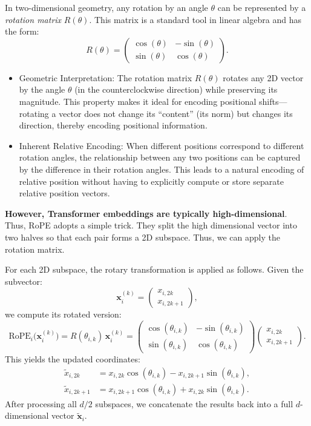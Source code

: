 In two-dimensional geometry, any rotation by an angle \(\theta\) can be represented by a \textit{rotation matrix} \(R(\theta)\). This matrix is a standard tool in linear algebra and has the form:
\[
R(\theta) = 
\begin{pmatrix}
\cos(\theta) & -\sin(\theta) \\
\sin(\theta) & \cos(\theta)
\end{pmatrix}.
\]
\begin{itemize}
	\item Geometric Interpretation: The rotation matrix \(R(\theta)\) rotates any 2D vector by the angle \(\theta\) (in the counterclockwise direction) while preserving its magnitude. This property makes it ideal for encoding positional shifts—rotating a vector does not change its ``content'' (its norm) but changes its direction, thereby encoding positional information.
	\item Inherent Relative Encoding: When different positions correspond to different rotation angles, the relationship between any two positions can be captured by the difference in their rotation angles. This leads to a natural encoding of relative position without having to explicitly compute or store separate relative position vectors.
\end{itemize}
\textbf{However, Transformer embeddings are typically high-dimensional}. Thus, RoPE adopts a simple trick. They split the high dimensional vector into two halves so that each pair forms a 2D subspace. Thus, we can apply the rotation matrix.

For each 2D subspace, the rotary transformation is applied as follows. Given the subvector:
\[
\mathbf{x}_i^{(k)} = 
\begin{pmatrix}
x_{i,2k} \\
x_{i,2k+1}
\end{pmatrix},
\]
we compute its rotated version:
\[
\text{RoPE}_i \bigl(\mathbf{x}_i^{(k)}\bigr)
= R(\theta_{i, k})\, \mathbf{x}_i^{(k)}
= \begin{pmatrix}
\cos(\theta_{i, k}) & -\sin(\theta_{i, k}) \\
\sin(\theta_{i, k}) & \cos(\theta_{i, k})
\end{pmatrix}
\begin{pmatrix}
x_{i,2k} \\
x_{i,2k+1}
\end{pmatrix}.
\]
This yields the updated coordinates:
\[
\begin{aligned}
\tilde{x}_{i, 2k} &= x_{i,2k}\cos(\theta_{i,k}) - x_{i,2k+1}\sin(\theta_{i,k}),\\[6pt]
\tilde{x}_{i, 2k+1} &= x_{i,2k+1}\cos(\theta_{i,k}) + x_{i,2k}\sin(\theta_{i,k}).
\end{aligned}
\]
After processing all \(d/2\) subspaces, we concatenate the results back into a full \(d\)-dimensional vector \(\tilde{\mathbf{x}}_i\).

